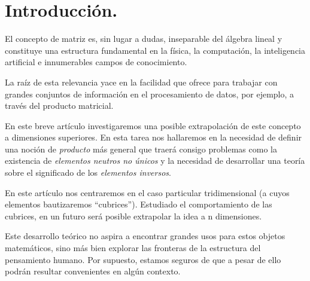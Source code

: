 \section{Introducción.}

El concepto de matriz es, sin lugar a dudas, inseparable del álgebra lineal y constituye una estructura fundamental en la física, la computación, la inteligencia artificial e innumerables campos de conocimiento.

La raíz de esta relevancia yace en la facilidad que ofrece para trabajar con grandes conjuntos de información en el procesamiento de datos, por ejemplo, a través del producto matricial.

En este breve artículo investigaremos una posible extrapolación de este concepto a dimensiones superiores. En esta tarea nos hallaremos en la necesidad de definir una noción de \textit{producto} más general que traerá consigo problemas como la existencia de \textit{elementos neutros no únicos} y la necesidad de desarrollar una teoría sobre el significado de los \textit{elementos inversos}.


En este artículo nos centraremos en el caso particular tridimensional (a cuyos elementos bautizaremos ``cubrices''). Estudiado el comportamiento de las cubrices, en un futuro será posible extrapolar la idea a n dimensiones.

Este desarrollo teórico no aspira a encontrar grandes usos para estos objetos matemáticos, sino más bien explorar las fronteras de la estructura del pensamiento humano. Por supuesto, estamos seguros de que a pesar de ello podrán resultar convenientes en algún contexto.

